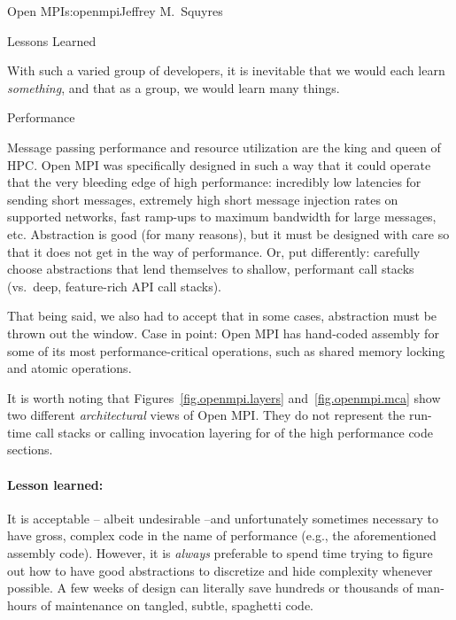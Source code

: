 \begin{aosachapter}{Open MPI}{s:openmpi}{Jeffrey M.\ Squyres}

\begin{aosasect1}{Lessons Learned}

With such a varied group of developers, it is inevitable that we would
each learn {\em something}, and that as a group, we would learn many
things.


\begin{aosasect2}{Performance}

Message passing performance and resource utilization are the king
and queen of HPC.
%
Open MPI was specifically designed in such a way that it could operate
that the very bleeding edge of high performance: incredibly low
latencies for sending short messages, extremely high short message
injection rates on supported networks, fast ramp-ups to maximum
bandwidth for large messages, etc.  
%
Abstraction is good (for many reasons), but it must be designed with
care so that it does not get in the way of performance.  Or, put
differently: carefully choose abstractions that lend themselves to
shallow, performant call stacks (vs.\ deep, feature-rich API call
stacks).

That being said, we also had to accept that in some cases, abstraction
must be thrown out the window.  Case in point: Open MPI has hand-coded
assembly for some of its most performance-critical operations, such as
shared memory locking and atomic operations.

It is worth noting that Figures~\ref{fig.openmpi.layers}
and~\ref{fig.openmpi.mca} show two different {\em architectural} views
of Open MPI.
%
They do not represent the run-time call stacks or calling invocation
layering for of the high performance code sections.


\paragraph{Lesson learned:} 

It is acceptable -- albeit undesirable --and unfortunately sometimes
necessary to have gross, complex code in the name of performance
(e.g., the aforementioned assembly code).
%
However, it is {\em always} preferable to spend time trying to figure
out how to have good abstractions to discretize and hide complexity
whenever possible.  A few weeks of design can literally save hundreds
or thousands of man-hours of maintenance on tangled, subtle, spaghetti
code.


\end{aosasect2}
\end{aosasect1}
\end{aosachapter}
